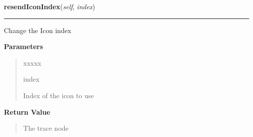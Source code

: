 \hspace{.8\funcindent}\begin{boxedminipage}{\funcwidth}

    \raggedright \textbf{resendIconIndex}(\textit{self}, \textit{index})

    \vspace{-1.5ex}

    \rule{\textwidth}{0.5\fboxrule}
\setlength{\parskip}{2ex}
    Change the Icon index

\setlength{\parskip}{1ex}
      \textbf{Parameters}
      \vspace{-1ex}

      \begin{quote}
        \begin{Ventry}{xxxxx}

          \item[index]

          Index of the icon to use

        \end{Ventry}

      \end{quote}

      \textbf{Return Value}
    \vspace{-1ex}

      \begin{quote}
      The trace node

      \end{quote}

    \end{boxedminipage}

    \label{tracetool:TraceNode:setBackgroundColor}

    \vspace{0.5ex}

